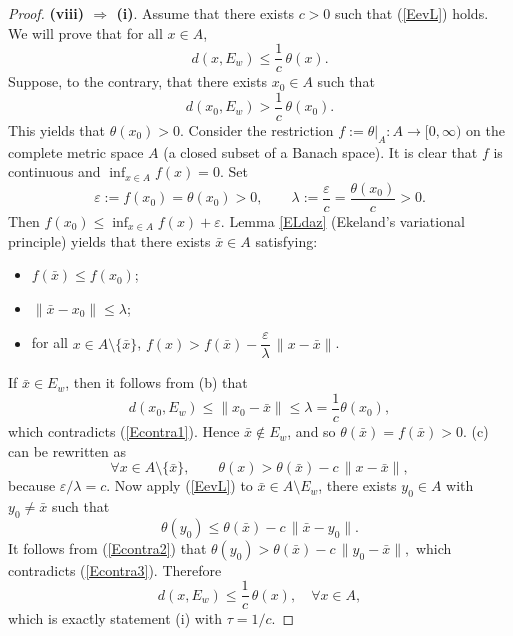 \documentclass[11pt]{article}
\begin{document}
\begin{proof}
	\noindent\textbf{(viii) $\Rightarrow$ (i)}.
	 		Assume that  there exists   \(c>0\) such that     (\ref{EevL})   holds.
	 			We will prove that for all \(x\in A\),
	 		\[
	 		d(x,E_w)\le \frac{1}{c}\,\theta(x).
	 		\]
	 		Suppose, to the contrary, that there exists \(x_0\in A\) such that  
	 		\begin{equation}\label{Econtra1}
	 			d(x_0,E_w)>\frac{1}{c}\,\theta(x_0).
	 		\end{equation}
	 	 This yields  that	 \(\theta(x_0)>0\). 
	 		Consider the restriction \(f:=\theta|_A\colon A\to[0,\infty)\) on the complete metric space \(A\) (a closed subset of a Banach space). It is clear that \(f\) is continuous  and \(\inf_{x \in A} f(x)=0\).  
	 		Set
	 		\[
	 		\varepsilon:=f(x_0)=\theta(x_0)>0,\qquad \lambda:=\frac{\varepsilon}{c}=\frac{\theta(x_0)}{c}>0 .
	 		\]
	 		Then \(f(x_0)\le \inf_{x \in A} f(x) +\varepsilon\).    Lemma  \ref{ELdaz} (Ekeland's variational principle)   yields that  there exists \(\bar x\in A\) satisfying:
	 		\begin{itemize}
	 			\item[(a)] \(f(\bar x)\le f(x_0)\);
	 			\item[(b)] \(\|\bar x-x_0\|\le \lambda\);
	 			\item[(c)] for all \(x\in A\setminus\{\bar x\}\), \(f(x) > f(\bar x)-\dfrac{\varepsilon}{\lambda}\,\|x-\bar x\|\).
	 		\end{itemize}
	 		If \(\bar x \in  E_w\), then  it follows from  (b) that
	 		\[
	 		d(x_0,E_w)\le \|x_0-\bar x\|\le \lambda = \frac{1}{c}\theta(x_0),
	 		\]
	 	which contradicts (\ref{Econtra1}). Hence   \(\bar x \notin  E_w\),  and so   \(\theta(\bar x)=f(\bar x)>0\).   (c) can be rewritten as
	 		\begin{equation}\label{Econtra2}
	 			\forall x\in A\setminus\{\bar x\},\qquad \theta(x) > \theta(\bar x) - c\,\|x-\bar x\|,
	 		\end{equation}
	 		because \(\varepsilon/\lambda = c\).
	 			 		Now apply  (\ref{EevL})   to \(\bar x\in A\setminus E_w\),  there exists \(y_0 \in A\) with \(y_0 \neq \bar x\) such that
	 		\begin{equation}\label{Econtra3}
	 			\theta(y_0 ) \le \theta(\bar x) - c\,\|\bar x-y_0\|.
	 		\end{equation}
	 It follows from  (\ref{Econtra2})  that		$\theta(y_0) > \theta(\bar x) - c\,\|y_0-\bar x\|,$
	 		which contradicts (\ref{Econtra3}). 
	 Therefore
	 		\[
	 		d(x,E_w)\le \frac{1}{c}\,\theta(x), \quad \forall x\in A,
	 		\]
	 		which is exactly statement (i) with \(\tau = 1/c\).
	 		

\end{proof}
\end{document}
